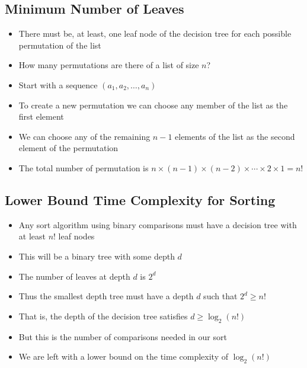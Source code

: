 
\begin{slide}
\section[-1]{Minimum Number of Leaves}

\begin{PauseHighLight}
  \begin{itemize}\squeeze
  \item There must be, at least, one leaf node of the decision tree for each
    possible permutation of the list\pause
  \item How many permutations are there of a list of size $n$?\pause
  \item Start with a sequence $(a_1, a_2, \ldots, a_n)$\pause
  \item To create a new permutation we can choose any member of the list
    as the first element\pause
  \item We can choose any of the remaining $n-1$ elements of the list as
    the second element of the permutation\pause
  \item The total number of permutation is
    $n\times(n-1)\times(n-2)\times \cdots \times 2 \times 1 = n!$\pause
  \end{itemize}
\end{PauseHighLight}

\end{slide}


\begin{slide}
\section[-1]{Lower Bound Time Complexity for Sorting}

\begin{PauseHighLight}
  \begin{itemize}
  \item Any sort algorithm using binary comparisons must have a decision
    tree with at least $n!$ leaf nodes\pause
  \item This will be a binary tree with some depth $d$\pause
  \item The number of leaves at depth $d$ is $2^d$\pause
  \item Thus the smallest depth tree must have a depth $d$ such that
    $2^d\geq n!$\pause
  \item That is, the depth of the decision tree satisfies $d\geq
    \log_2(n!)$\pause
  \item But this is the number of comparisons needed in our sort\pause
  \item We are left with a lower bound on the time complexity of
    $\log_2(n!)$\pause
  \end{itemize}
\end{PauseHighLight}

\end{slide}



